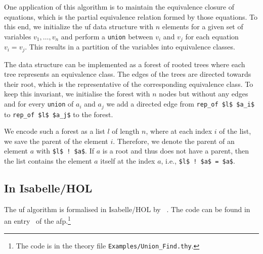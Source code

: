 \documentclass[
  sigplan,
  10pt,
  anonymous,
  review,
  ]{acmart}
\begin{document}
One application of this algorithm is to maintain the equivalence closure of equations, which is the partial equivalence relation formed by those equations.
To this end, we initialize the \acrshort{uf} data structure with $n$ elements for a given set of variables $v_1, \ldots, v_n$ and perform a \lstinline!union! between $v_i$ and $v_j$ for each equation $v_i = v_j$.
This results in a partition of the variables into equivalence classes.

The data structure can be implemented as a forest of rooted trees where each tree represents an equivalence class.
The edges of the trees are directed towards their root, which is the representative of the corresponding equivalence class.
To keep this invariant, we initialise the forest with $n$ nodes but without any edges and for every \lstinline!union! of $a_i$ and $a_j$ we add a directed edge from \lstinline!rep_of $l$ $a_i$! to \lstinline!rep_of $l$ $a_j$! to the forest.

We encode such a forest as a list $l$ of length $n$, where at each index $i$ of the list, we save the parent of the element $i$.
Therefore, we denote the parent of an element $a$ with \lstinline|$l$ ! $a$|.
If $a$ is a root and thus does not have a parent, then the list contains the element $a$ itself at the index $a$, i.e., \lstinline|$l$ ! $a$ = $a$|.

\subsection{In Isabelle/HOL\label{sec:uf_hol}}
The \acrshort{uf} algorithm is formalised in Isabelle/HOL by \citeauthor{uf_isabelle}~\cite{uf_isabelle}.
The code can be found in an entry~\cite{uf_isabelle_afp} of the \acrfull{afp}.\footnote{The code is in the theory file \texttt{Examples/Union\_Find.thy}.}
\end{document}

